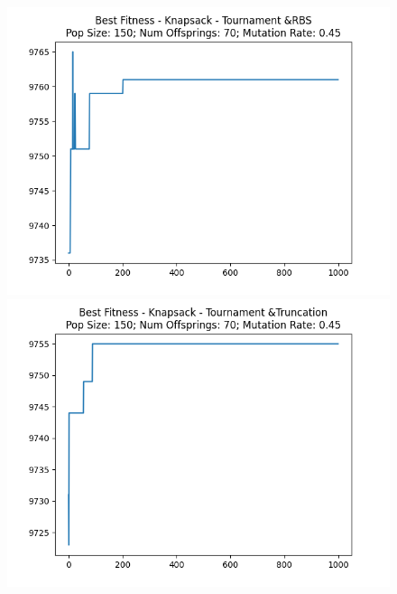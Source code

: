 \documentclass[12pt]{report}
\theoremstyle{mytheoremstyle}
\theoremstyle{mytheoremstyle}
\theoremstyle{myproblemstyle}
\begin{document}
\begin{figure}[!]
\begin{minipage}{0.4\textwidth}
		\includegraphics[width=\linewidth]{../Analysis/BSF_Knapsack_2_1_150_70.png}
	\end{minipage}
	\hspace{\fill}
	\begin{minipage}{0.4\textwidth}
		\includegraphics[width=\linewidth]{../Analysis/BSF_Knapsack_2_3_150_70.png}
	\end{minipage}
	\vspace*{1cm}
	\begin{minipage}{0.4\textwidth}

\end{minipage}
\end{figure}
\end{document}
